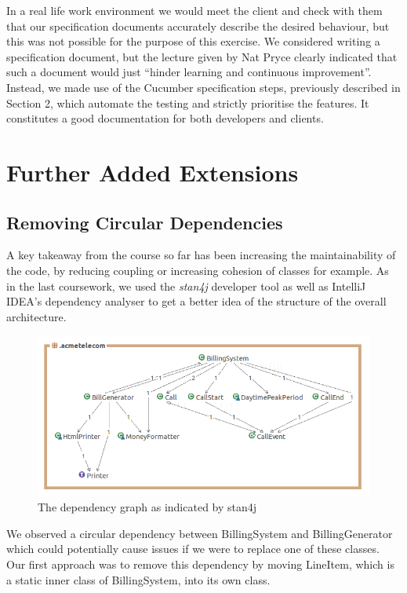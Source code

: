 \documentclass[a4paper]{article}
\begin{document}
In a real life work environment we would meet the client and check with them that our specification documents accurately describe the desired behaviour, but this was not possible for the purpose of this exercise. We considered writing a specification document, but the lecture given by Nat Pryce clearly indicated that such a document would just “hinder learning and continuous improvement”. Instead, we made use of the Cucumber specification steps, previously described in Section 2, which automate the testing and strictly prioritise the features. It constitutes a good documentation for both developers and clients.


\section{Further Added Extensions}

\subsection{Removing Circular Dependencies}

A key takeaway from the course so far has been increasing the maintainability of the code, by reducing coupling or increasing cohesion of classes for example. As in the last coursework, we used the \emph{stan4j} developer tool as well as IntelliJ IDEA's dependency analyser to get a better idea of the structure of the overall architecture.

\begin{figure}[h]
\centering
\includegraphics[width=\textwidth]{dependency_graph}
\caption{The dependency graph as indicated by stan4j}
\end{figure}

We observed a circular dependency between BillingSystem and BillingGenerator which could potentially cause issues if we were to replace one of these classes. Our first approach was to remove this dependency by moving LineItem, which is a static inner class of BillingSystem, into its own class. 
\end{document}
